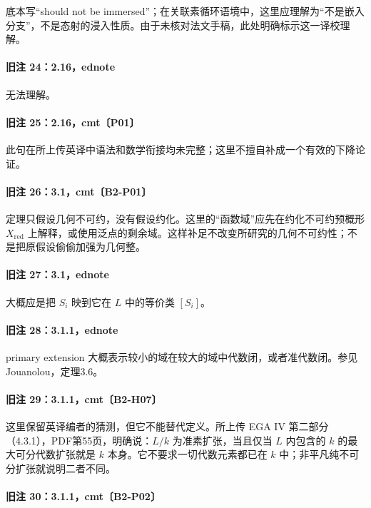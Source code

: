 底本写“should not be immersed”；在关联素循环语境中，这里应理解为“不是嵌入分支”，不是态射的浸入性质。由于未核对法文手稿，此处明确标示这一译校理解。

\paragraph{旧注 24：2.16，ednote}

无法理解。

\paragraph{旧注 25：2.16，cmt〔P01〕}

此句在所上传英译中语法和数学衔接均未完整；这里不擅自补成一个有效的下降论证。

\paragraph{旧注 26：3.1，cmt〔B2-P01〕}

定理只假设几何不可约，没有假设约化。这里的“函数域”应先在约化不可约预概形 $X_{\mathrm{red}}$ 上解释，或使用泛点的剩余域。这样补足不改变所研究的几何不可约性；不是把原假设偷偷加强为几何整。

\paragraph{旧注 27：3.1，ednote}

大概应是把 $S_i$ 映到它在 $L$ 中的等价类 $[S_i]$。

\paragraph{旧注 28：3.1.1，ednote}

primary extension 大概表示较小的域在较大的域中代数闭，或者准代数闭。参见 Jouanolou，定理3.6。

\paragraph{旧注 29：3.1.1，cmt〔B2-H07〕}

这里保留英译编者的猜测，但它不能替代定义。所上传 EGA IV 第二部分（4.3.1），PDF第55页，明确说：$L/k$ 为准素扩张，当且仅当 $L$ 内包含的 $k$ 的最大可分代数扩张就是 $k$ 本身。它不要求一切代数元素都已在 $k$ 中；非平凡纯不可分扩张就说明二者不同。

\paragraph{旧注 30：3.1.1，cmt〔B2-P02〕}

